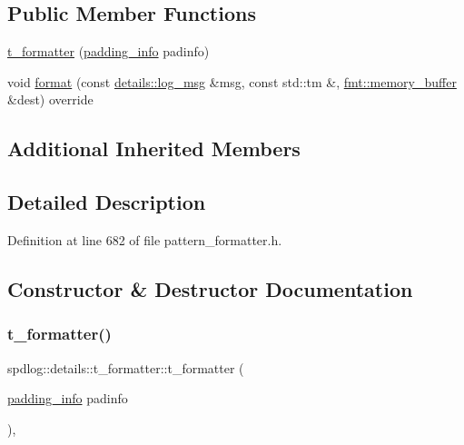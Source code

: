 \subsection*{Public Member Functions}
\begin{DoxyCompactItemize}
\item 
\hyperlink{classspdlog_1_1details_1_1t__formatter_a8cd4b638e72934a3ca2517d00e2aa06b}{t\+\_\+formatter} (\hyperlink{structspdlog_1_1details_1_1padding__info}{padding\+\_\+info} padinfo)
\item 
void \hyperlink{classspdlog_1_1details_1_1t__formatter_a58cd7de54067c8f05815a94edaf43e17}{format} (const \hyperlink{structspdlog_1_1details_1_1log__msg}{details\+::log\+\_\+msg} \&msg, const std\+::tm \&, \hyperlink{format_8h_a21cbf729f69302f578e6db21c5e9e0d2}{fmt\+::memory\+\_\+buffer} \&dest) override
\end{DoxyCompactItemize}
\subsection*{Additional Inherited Members}


\subsection{Detailed Description}


Definition at line 682 of file pattern\+\_\+formatter.\+h.



\subsection{Constructor \& Destructor Documentation}
\mbox{\label{classspdlog_1_1details_1_1t__formatter_a8cd4b638e72934a3ca2517d00e2aa06b}} 
\subsubsection{\texorpdfstring{t\+\_\+formatter()}{t\_formatter()}}
{\footnotesize\ttfamily spdlog\+::details\+::t\+\_\+formatter\+::t\+\_\+formatter (\begin{DoxyParamCaption}\item[{\hyperlink{structspdlog_1_1details_1_1padding__info}{padding\+\_\+info}}]{padinfo }\end{DoxyParamCaption})\hspace{0.3cm}{\ttfamily [inline]}, {\ttfamily [explicit]}}



